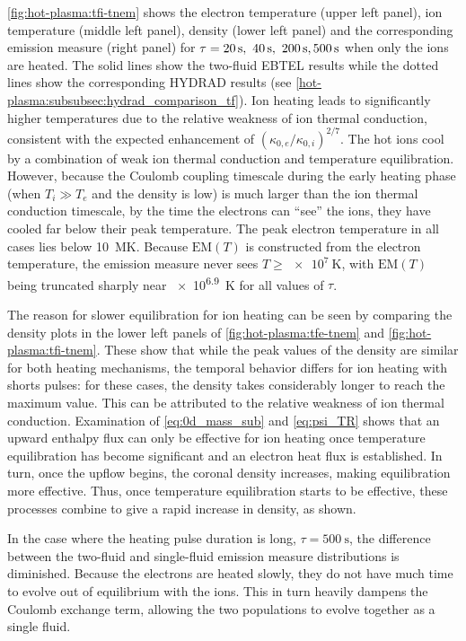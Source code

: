 \autoref{fig:hot-plasma:tfi-tnem} shows the electron temperature (upper left panel), ion temperature (middle left panel), density (lower left panel) and the corresponding emission measure (right panel) for $\tau=\SIlist[list-final-separator = {,}]{20;40;200;500}{\second}$ when only the ions are heated. The solid lines show the two-fluid EBTEL results while the dotted lines show the corresponding HYDRAD results (see \autoref{hot-plasma:subsubsec:hydrad_comparison_tf}). Ion heating leads to significantly higher temperatures due to the relative weakness of ion thermal conduction, consistent with the expected enhancement of $(\kappa_{0,e}/\kappa_{0,i})^{2/7}$. The hot ions cool by a combination of weak ion thermal conduction and temperature equilibration. However, because the Coulomb coupling timescale during the early heating phase (when $T_i\gg T_e$ and the density is low) is much larger than the ion thermal conduction timescale, by the time the electrons can ``see'' the ions, they have cooled far below their peak temperature. The peak electron temperature in all cases lies below \SI{10}{\mega\kelvin}. Because $\mathrm{EM}(T)$ is constructed from the electron temperature, the emission measure never sees $T\ge\SI{e7}{\kelvin}$, with $\mathrm{EM}(T)$ being truncated sharply near \SI{e6.9}{\kelvin} for all values of $\tau$.

The reason for slower equilibration for ion heating can be seen by comparing the density plots in the lower left panels of \autoref{fig:hot-plasma:tfe-tnem} and \autoref{fig:hot-plasma:tfi-tnem}. These show that while the peak values of the density are similar for both heating mechanisms, the temporal behavior differs for ion heating with shorts pulses: for these cases, the density takes considerably longer to reach the maximum value. This can be attributed to the relative weakness of ion thermal conduction. Examination of \autoref{eq:0d_mass_sub} and \autoref{eq:psi_TR} shows that an upward enthalpy flux can only be effective for ion heating once temperature equilibration has become significant and an electron heat flux is established. In turn, once the upflow begins, the coronal density increases, making equilibration more effective. Thus, once temperature equilibration starts to be effective, these processes combine to give a rapid increase in density, as shown.

In the case where the heating pulse duration is long, $\tau=\SI{500}{\second}$, the difference between the two-fluid and single-fluid emission measure distributions is diminished. Because the electrons are heated slowly, they do not have much time to evolve out of equilibrium with the ions. This in turn heavily dampens the Coulomb exchange term, allowing the two populations to evolve together as a single fluid.


